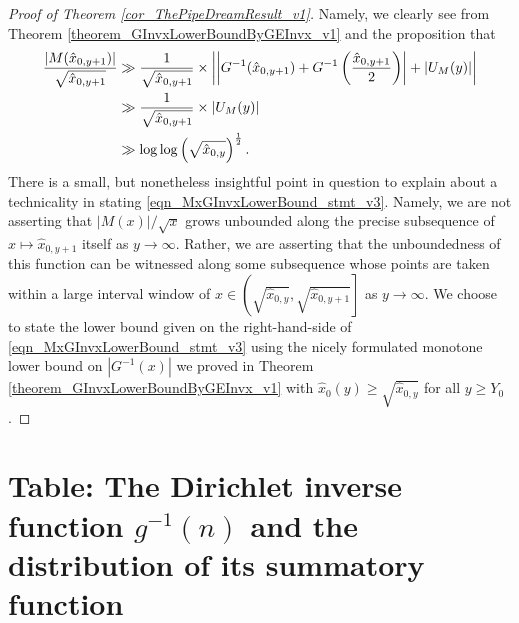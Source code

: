 \documentclass[11pt,reqno,a4letter]{article}
\numberwithin{figure}{section}
\numberwithin{table}{section}
\theoremstyle{plain}
\numberwithin{theorem}{section}
\theoremstyle{definition}
\begin{document}
\begin{proof}[Proof of Theorem \ref{cor_ThePipeDreamResult_v1}]
Namely, we clearly see from Theorem \ref{theorem_GInvxLowerBoundByGEInvx_v1} and the 
proposition that 
\begin{align} 
\notag 
\frac{|M(\hat{x}_{0,y+1})|}{\sqrt{\hat{x}_{0,y+1}}} & \gg \frac{1}{\sqrt{\hat{x}_{0,y+1}}} \times 
     \left\lvert \left\lvert 
     G^{-1}(\hat{x}_{0,y+1}) + G^{-1}\left(\frac{\hat{x}_{0,y+1}}{2}\right) \right\rvert + 
     \left\lvert U_M(y) \right\rvert \right\rvert \\ 
\notag 
     & \gg \frac{1}{\sqrt{\hat{x}_{0,y+1}}} \times \left\lvert U_M(y) \right\rvert \\ 
\label{eqn_MxGInvxLowerBound_stmt_v3} 
     & \gg \log\log\left(\sqrt{\hat{x}_{0,y}}\right)^{\frac{1}{2}}. 
\end{align} 
There is a small, but nonetheless insightful point in question 
to explain about a 
technicality in stating \eqref{eqn_MxGInvxLowerBound_stmt_v3}. 
Namely, we are not asserting that 
$|M(x)| / \sqrt{x}$ grows unbounded along the precise subsequence of 
$x \mapsto \hat{x}_{0,y+1}$ itself as $y \rightarrow \infty$. 
Rather, we are asserting that the unboundedness of this function 
can be witnessed along some subsequence whose points are taken within a 
large interval window of 
$x \in \left(\sqrt{\hat{x}_{0,y}}, \sqrt{\hat{x}_{0,y+1}}\right]$ as 
$y \rightarrow \infty$. 
We choose to state the lower bound given on the right-hand-side of 
\eqref{eqn_MxGInvxLowerBound_stmt_v3} using the nicely formulated 
monotone lower bound on $|G^{-1}(x)|$ we proved in 
Theorem \ref{theorem_GInvxLowerBoundByGEInvx_v1} 
with $\hat{x}_0(y) \geq \sqrt{\hat{x}_{0,y}}$ for all $y \geq Y_0$. 
\end{proof} 

\newpage 
\renewcommand{\refname}{References} 
{}


\newpage
\setcounter{section}{0} 
\renewcommand{\thesection}{T.\arabic{section}} 

\section{Table: The Dirichlet inverse function $g^{-1}(n)$ and the 
         distribution of its summatory function} 
\label{table_conjecture_Mertens_ginvSeq_approx_values}
\end{document}
